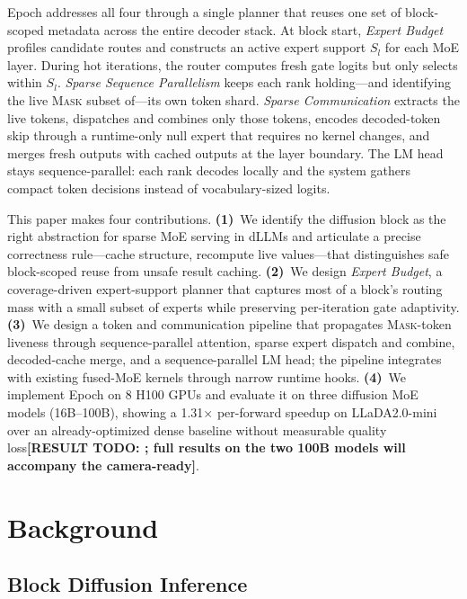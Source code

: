 \documentclass[sigconf,review,anonymous, 10pt]{acmart}
\newcommand{\resulttodo}[1]{\textcolor{todored}{\textbf{[RESULT TODO: #1]}}}
\newcommand{\sys}{Epoch}
\newcommand{\mask}{\textsc{Mask}}
\begin{document}
\sys{} addresses all four through a single planner that reuses one set of block-scoped metadata across the entire decoder stack.
At block start, \emph{Expert Budget} profiles candidate routes and constructs an active expert support $S_l$ for each MoE layer.
During hot iterations, the router computes fresh gate logits but only selects within $S_l$.
\emph{Sparse Sequence Parallelism} keeps each rank holding---and identifying the live \mask{} subset of---its own token shard.
\emph{Sparse Communication} extracts the live tokens, dispatches and combines only those tokens, encodes decoded-token skip through a runtime-only null expert that requires no kernel changes, and merges fresh outputs with cached outputs at the layer boundary.
The LM head stays sequence-parallel: each rank decodes locally and the system gathers compact token decisions instead of vocabulary-sized logits.

This paper makes four contributions.
\textbf{(1)}~We identify the diffusion block as the right abstraction for sparse MoE serving in dLLMs and articulate a precise correctness rule---cache structure, recompute live values---that distinguishes safe block-scoped reuse from unsafe result caching.
\textbf{(2)}~We design \emph{Expert Budget}, a coverage-driven expert-support planner that captures most of a block's routing mass with a small subset of experts while preserving per-iteration gate adaptivity.
\textbf{(3)}~We design a token and communication pipeline that propagates \mask{}-token liveness through sequence-parallel attention, sparse expert dispatch and combine, decoded-cache merge, and a sequence-parallel LM head; the pipeline integrates with existing fused-MoE kernels through narrow runtime hooks.
\textbf{(4)}~We implement \sys{} on 8 H100 GPUs and evaluate it on three diffusion MoE models (16B--100B), showing a 1.31$\times$ per-forward speedup on LLaDA2.0-mini over an already-optimized dense baseline without measurable quality loss\resulttodo{; full results on the two 100B models will accompany the camera-ready}.

\section{Background}

\subsection{Block Diffusion Inference}
\end{document}
